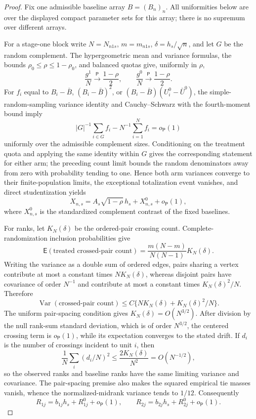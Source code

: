 \documentclass{article}
\begin{document}
\begin{proof}
Fix one admissible baseline array \(B=(B_n)_n\).  All uniformities below are over the displayed compact parameter sets for this array; there is no supremum over different arrays.

For a stage-one block write \(N=N_{n1s}\), \(m=m_{n1s}\), \(\delta=h_s/\sqrt n\), and let \(G\) be the random complement.  The hypergeometric mean and variance formulas, the bounds \(\rho_0\le\rho\le1-\rho_0\), and balanced quotas give, uniformly in \(\rho\),
\[
\frac{g^1}{N}\xrightarrow{\mathsf P}\frac{1-\rho}{2},
\qquad
\frac{g^0}{N}\xrightarrow{\mathsf P}\frac{1-\rho}{2}.
\]
For \(f_i\) equal to \(B_i-\bar B\), \((B_i-\bar B)^2\), or \((B_i-\bar B)(U_i^0-\bar U^0)\), the simple-random-sampling variance identity and Cauchy--Schwarz with the fourth-moment bound imply
\[
|G|^{-1}\sum_{i\in G}f_i-N^{-1}\sum_{i=1}^Nf_i=o_{\mathsf P}(1)
\]
uniformly over the admissible complement sizes.  Conditioning on the treatment quota and applying the same identity within \(G\) gives the corresponding statement for either arm; the preceding count limit bounds the random denominators away from zero with probability tending to one.  Hence both arm variances converge to their finite-population limits, the exceptional totalization event vanishes, and direct studentization yields
\[
X_{n,s}=A_s\sqrt{1-\rho}\,h_s+X^0_{n,s}+o_{\mathsf P}(1),
\]
where \(X^0_{n,s}\) is the standardized complement contrast of the fixed baselines.

For ranks, let \(K_N(\delta)\) be the ordered-pair crossing count.  Complete-randomization inclusion probabilities give
\[
\mathsf E(\text{treated crossed-pair count})
=\frac{m(N-m)}{N(N-1)}K_N(\delta).
\]
Writing the variance as a double sum of ordered edges, pairs sharing a vertex contribute at most a constant times \(NK_N(\delta)\), whereas disjoint pairs have covariance of order \(N^{-1}\) and contribute at most a constant times \(K_N(\delta)^2/N\).  Therefore
\[
\operatorname{Var}(\text{crossed-pair count})
\le C\{NK_N(\delta)+K_N(\delta)^2/N\}.
\]
The uniform pair-spacing condition gives \(K_N(\delta)=O(N^{3/2})\).  After division by the null rank-sum standard deviation, which is of order \(N^{3/2}\), the centered crossing term is \(o_{\mathsf P}(1)\), while its expectation converges to the stated drift.  If \(d_i\) is the number of crossings incident to unit \(i\), then
\[
\frac1N\sum_i(d_i/N)^2\le\frac{2K_N(\delta)}{N^2}=O(N^{-1/2}),
\]
so the observed ranks and baseline ranks have the same limiting variance and covariance.  The pair-spacing premise also makes the squared empirical tie masses vanish, whence the normalized-midrank variance tends to \(1/12\).  Consequently
\[
R_{1j}=b_{1j}h_s+R^0_{1j}+o_{\mathsf P}(1),
\qquad
R_{2j}=b_{2j}h_s+R^0_{2j}+o_{\mathsf P}(1).
\]


\end{proof}
\end{document}
